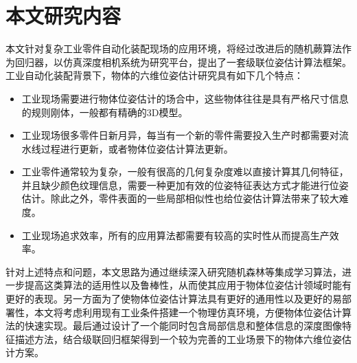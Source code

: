 \section{本文研究内容}

本文针对复杂工业零件自动化装配现场的应用环境，将经过改进后的随机蕨算法作为回归器，以仿真深度相机系统为研究平台，提出了一套级联位姿估计算法框架。工业自动化装配背景下，物体的六维位姿估计研究具有如下几个特点：
\begin{itemize}
\item 工业现场需要进行物体位姿估计的场合中，这些物体往往是具有严格尺寸信息的规则刚体，一般都有精确的3D模型。
\item 工业现场很多零件日新月异，每当有一个新的零件需要投入生产时都需要对流水线过程进行更新，或者物体位姿估计算法更新。
\item 工业零件通常较为复杂，一般有很高的几何复杂度难以直接计算其几何特征，并且缺少颜色纹理信息，需要一种更加有效的位姿特征表达方式才能进行位姿估计。除此之外，零件表面的一些局部相似性也给位姿估计算法带来了较大难度。
\item 工业现场追求效率，所有的应用算法都需要有较高的实时性从而提高生产效率。
\end{itemize}

针对上述特点和问题，本文思路为通过继续深入研究随机森林等集成学习算法，进一步提高这类算法的适用性以及鲁棒性，从而使其应用于物体位姿估计领域时能有更好的表现。另一方面为了使物体位姿估计算法具有更好的通用性以及更好的易部署性，本文将考虑利用现有工业条件搭建一个物理仿真环境，方便物体位姿估计算法的快速实现。最后通过设计了一个能同时包含局部信息和整体信息的深度图像特征描述方法，结合级联回归框架得到一个较为完善的工业场景下的物体六维位姿估计方案。

